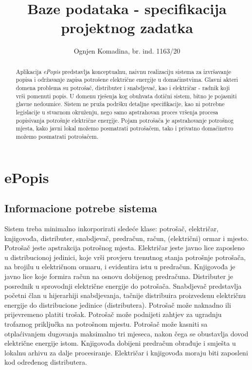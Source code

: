 \documentclass{article}
\title{Baze podataka - specifikacija projektnog zadatka}
\author{Ognjen Komadina, br. ind. 1163/20}
\begin{document}
\maketitle

\begin{abstract}
Aplikacija \textit{ePopis} predstavlja konceptualnu, naivnu realizaciju sistema za izvršavanje popisa i održavanje zapisa potrošene električne energije u domaćinstvima. Glavni akteri domena problema su potrošač, distributer i snabdjevač, kao i električar - radnik koji vrši pomenuti popis.
U domenu rješenja kog obuhvata dotični sistem, bitno je pojasniti glavne nedoumice. Sistem ne pruža podršku detaljne specifikacije, kao ni potrebne legislacije u stvarnom okruženju, nego samo apstrahovan proces vršenja procesa popisivanja potrošnje električne energije. Pojam potrošača je apstrahovanje potrošnog mjesta, kako javni lokal možemo posmatrati potrošačem, tako i privatno domaćinstvo možemo posmatrati potrošačem.
\end{abstract}


\section{ePopis}
\subsection{Informacione potrebe sistema}
Sistem treba minimalno inkorporirati sledeće klase: potrošač, električar, knjigovođa, distributer, snabdjevač, predračun, račun, (električni) ormar i mjesto. Potrošač jeste apstrakcija potrošnog mjesta. Električar jeste javno lice zaposleno u distribucionoj jedinici, koje vrši provjeru trenutnog stanja potrošnje potrošača, na brojilu u električnom ormaru, i evidentira istu u predračun. Knjigovođa je javno lice koje formira račun na osnovu dobijenog predračuna. Distributer je posrednik u sprovodnji električne energije do potrošača. Snabdjevač predstavlja početni član u hijerarhiji snabdjevanja, tačnije distribuira proizvedenu električnu energije do distribucione jedinice (distributera). Potrošač može naknadno ili prijevremeno platiti trošak. Potrošač može podnijeti zahtjev za ugradnju trofaznog priključka na potrošnom mjestu. Potrošač može kasniti sa otplaćivanjem dugovanja maksimalno tri mjeseca, nakon čega se obustavlja dovod električne energije istom. Knjigovođa dobijeni predračun obrađuje i smješta u lokalnu arhivu za dalje procesiranje. Električar i knjigovođa moraju biti zaposleni kod određenog distributera.
\end{document}
